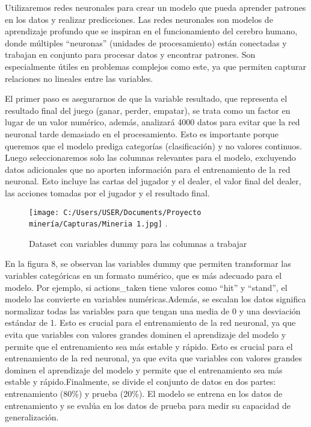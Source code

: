 \documentclass[conference,final,]{IEEEtran}
\begin{document}
Utilizaremos redes neuronales para crear un modelo que pueda aprender
patrones en los datos y realizar predicciones. Las redes neuronales son
modelos de aprendizaje profundo que se inspiran en el funcionamiento del
cerebro humano, donde múltiples ``neuronas'' (unidades de procesamiento)
están conectadas y trabajan en conjunto para procesar datos y encontrar
patrones. Son especialmente útiles en problemas complejos como este, ya
que permiten capturar relaciones no lineales entre las variables.

El primer paso es asegurarnos de que la variable resultado, que
representa el resultado final del juego (ganar, perder, empatar), se
trata como un factor en lugar de un valor numérico, además, analizará
4000 datos para evitar que la red neuronal tarde demasiado en el
procesamiento. Esto es importante porque queremos que el modelo prediga
categorías (clasificación) y no valores continuos. Luego seleccionaremos
solo las columnas relevantes para el modelo, excluyendo datos
adicionales que no aporten información para el entrenamiento de la red
neuronal. Esto incluye las cartas del jugador y el dealer, el valor
final del dealer, las acciones tomadas por el jugador y el resultado
final.

\begin{figure}[htbp]
\centering
\texttt{[image: C:/Users/USER/Documents/Proyecto minería/Capturas/Mineria 1.jpg]}
\DeclareGraphicsExtensions.
\caption{Dataset con variables dummy para las columnas a trabajar}
\label{Mineria 1}
\end{figure}

En la figura 8, se observan las variables dummy que permiten transformar
las variables categóricas en un formato numérico, que es más adecuado
para el modelo. Por ejemplo, si actions\_taken tiene valores como
``hit'' y ``stand'', el modelo las convierte en variables
numéricas.Además, se escalan los datos significa normalizar todas las
variables para que tengan una media de 0 y una desviación estándar de 1.
Esto es crucial para el entrenamiento de la red neuronal, ya que evita
que variables con valores grandes dominen el aprendizaje del modelo y
permite que el entrenamiento sea más estable y rápido. Esto es crucial
para el entrenamiento de la red neuronal, ya que evita que variables con
valores grandes dominen el aprendizaje del modelo y permite que el
entrenamiento sea más estable y rápido.Finalmente, se divide el conjunto
de datos en dos partes: entrenamiento (80\%) y prueba (20\%). El modelo
se entrena en los datos de entrenamiento y se evalúa en los datos de
prueba para medir su capacidad de generalización.
\end{document}
